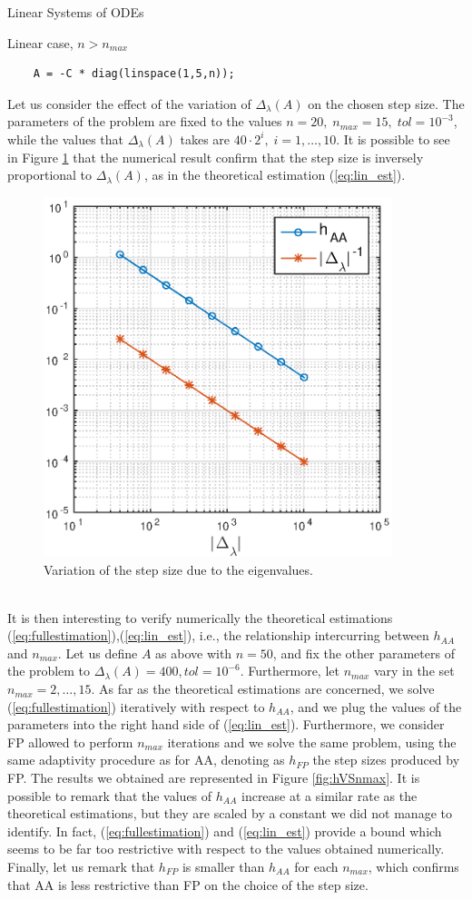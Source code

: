 \documentclass{article}
\begin{document}
\begin{section}{Linear Systems of ODEs}
\begin{subsection}{Linear case, $n > n_{max}$}
\begin{verbatim}
	A = -C * diag(linspace(1,5,n));
\end{verbatim}
Let us consider the effect of the variation of $\Delta_\lambda(A)$ on the chosen step size. The parameters of the problem are fixed to the values $n = 20, \; n_{max} = 15, \; tol = 10^{-3}$, while the values that $\Delta_\lambda(A)$ takes are $40\cdot 2^{i}, \; i = 1, \dots, 10$. It is possible to see in Figure \ref{fig:hvslambda} that the numerical result confirm that the step size is inversely proportional to $\Delta_\lambda(A)$, as in the theoretical estimation (\ref{eq:lin_est}).
\begin{figure}[t!]
\centering
\includegraphics[width=4in]{Pictures/timestepVSlambda}
\caption{Variation of the step size due to the eigenvalues.}
\label{fig:hvslambda}
\end{figure}\\
It is then interesting to verify numerically the theoretical estimations (\ref{eq:fullestimation}),(\ref{eq:lin_est}), i.e., the relationship intercurring between $h_{AA}$ and $n_{max}$. Let us define $A$ as above with $n = 50$, and fix the other parameters of the problem to $\Delta_\lambda(A) = 400,  tol = 10^{-6}$. Furthermore, let $n_{max}$ vary in the set $n_{max} = 2,\dots,15$. As far as the theoretical estimations are concerned, we solve (\ref{eq:fullestimation}) iteratively with respect to $h_{AA}$, and we plug the values of the parameters into the right hand side of (\ref{eq:lin_est}). Furthermore, we consider FP allowed to perform $n_{max}$ iterations and we solve the same problem, using the same adaptivity procedure as for AA, denoting as $h_{FP}$ the step sizes produced by FP. The results we obtained are represented in Figure \ref{fig:hVSnmax}. It is possible to remark that the values of $h_{AA}$ increase at a similar rate as the theoretical estimations, but they are scaled by a constant we did not manage to identify. In fact, (\ref{eq:fullestimation}) and (\ref{eq:lin_est}) provide a bound which seems to be far too restrictive with respect to the values obtained numerically. Finally, let us remark that $h_{FP}$ is smaller than $h_{AA}$ for each $n_{max}$, which confirms that AA is less restrictive than FP on the choice of the step size.

\end{subsection}
\end{section}
\end{document}
